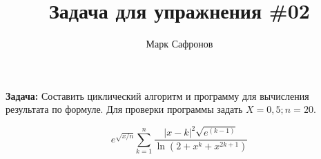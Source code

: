 \documentclass{article}
\title{Задача для упражнения \#02}
\author{Марк Сафронов}
\begin{document}
\maketitle

\textbf{Задача:}
Составить циклический алгоритм и программу для вычисления результата по формуле.
Для проверки программы задать $X = 0,5; n = 20$.

\begin{equation}
e^{\sqrt{x/n}} \sum_{k=1}^n \frac{|x-k|^2 \sqrt{e^{(k - 1)}} }{\ln( 2 + x^k + x^{2k + 1} ) }
\end{equation}
\end{document}
